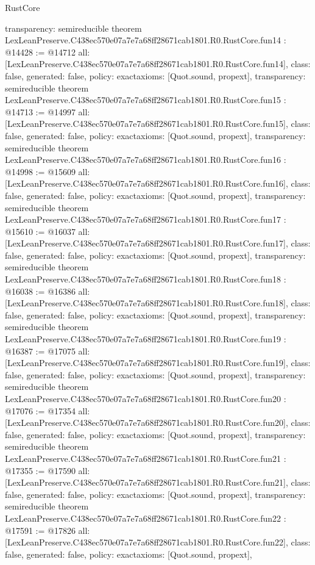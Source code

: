 \begin{lexlean}{RustCore}
\begin{coremodule}
{  transparency: semireducible
}
theorem LexLeanPreserve.C438ec570e07a7e7a68ff28671cab1801.R0.RustCore.fun14 : @14428 := @14712 {
  all: [LexLeanPreserve.C438ec570e07a7e7a68ff28671cab1801.R0.RustCore.fun14],
  class: false,
  generated: false,
  policy: exact{axioms: [Quot.sound, propext]},
  transparency: semireducible
}
theorem LexLeanPreserve.C438ec570e07a7e7a68ff28671cab1801.R0.RustCore.fun15 : @14713 := @14997 {
  all: [LexLeanPreserve.C438ec570e07a7e7a68ff28671cab1801.R0.RustCore.fun15],
  class: false,
  generated: false,
  policy: exact{axioms: [Quot.sound, propext]},
  transparency: semireducible
}
theorem LexLeanPreserve.C438ec570e07a7e7a68ff28671cab1801.R0.RustCore.fun16 : @14998 := @15609 {
  all: [LexLeanPreserve.C438ec570e07a7e7a68ff28671cab1801.R0.RustCore.fun16],
  class: false,
  generated: false,
  policy: exact{axioms: [Quot.sound, propext]},
  transparency: semireducible
}
theorem LexLeanPreserve.C438ec570e07a7e7a68ff28671cab1801.R0.RustCore.fun17 : @15610 := @16037 {
  all: [LexLeanPreserve.C438ec570e07a7e7a68ff28671cab1801.R0.RustCore.fun17],
  class: false,
  generated: false,
  policy: exact{axioms: [Quot.sound, propext]},
  transparency: semireducible
}
theorem LexLeanPreserve.C438ec570e07a7e7a68ff28671cab1801.R0.RustCore.fun18 : @16038 := @16386 {
  all: [LexLeanPreserve.C438ec570e07a7e7a68ff28671cab1801.R0.RustCore.fun18],
  class: false,
  generated: false,
  policy: exact{axioms: [Quot.sound, propext]},
  transparency: semireducible
}
theorem LexLeanPreserve.C438ec570e07a7e7a68ff28671cab1801.R0.RustCore.fun19 : @16387 := @17075 {
  all: [LexLeanPreserve.C438ec570e07a7e7a68ff28671cab1801.R0.RustCore.fun19],
  class: false,
  generated: false,
  policy: exact{axioms: [Quot.sound, propext]},
  transparency: semireducible
}
theorem LexLeanPreserve.C438ec570e07a7e7a68ff28671cab1801.R0.RustCore.fun20 : @17076 := @17354 {
  all: [LexLeanPreserve.C438ec570e07a7e7a68ff28671cab1801.R0.RustCore.fun20],
  class: false,
  generated: false,
  policy: exact{axioms: [Quot.sound, propext]},
  transparency: semireducible
}
theorem LexLeanPreserve.C438ec570e07a7e7a68ff28671cab1801.R0.RustCore.fun21 : @17355 := @17590 {
  all: [LexLeanPreserve.C438ec570e07a7e7a68ff28671cab1801.R0.RustCore.fun21],
  class: false,
  generated: false,
  policy: exact{axioms: [Quot.sound, propext]},
  transparency: semireducible
}
theorem LexLeanPreserve.C438ec570e07a7e7a68ff28671cab1801.R0.RustCore.fun22 : @17591 := @17826 {
  all: [LexLeanPreserve.C438ec570e07a7e7a68ff28671cab1801.R0.RustCore.fun22],
  class: false,
  generated: false,
  policy: exact{axioms: [Quot.sound, propext]},
}
\end{coremodule}
\end{lexlean}
